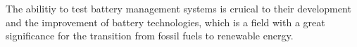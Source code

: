 \IEEEPARstart
{T}{he} abilitiy to test battery management systems is cruical 
to their development and the improvement of battery technologies,
which is a field with a great significance for the transition
from fossil fuels to renewable energy. 

